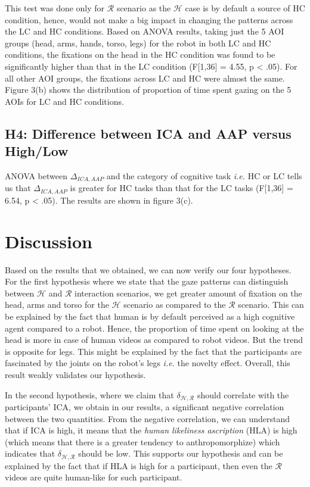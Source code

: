 \documentclass{acm_proc_article-sp}
\begin{document}
This test was done only for $\mathcal{R}$ scenario as the $\mathcal{H}$ case is
by default a source of HC condition, hence, would not make a big impact in
changing the patterns across the LC and HC conditions. Based on ANOVA results,
taking just the 5 AOI groups (head, arms, hands, torso, legs) for the robot in
both LC and HC conditions, the fixations on the head in the HC condition was
found to be significantly higher than that in the LC condition (F[1,36] = 4.55,
p < .05). For all other AOI groups, the fixations across LC and HC were almost
the same. Figure 3(b) shows the distribution of proportion of time spent gazing
on the 5 AOIs for LC and HC conditions.

\subsection{H4: Difference between ICA and AAP versus High/Low}

ANOVA between $\Delta_{ICA,AAP}$ and the category of cognitive task
\textit{i.e.} HC or LC tells us that $\Delta_{ICA,AAP}$ is greater for HC tasks
than that for the LC tasks (F[1,36] = 6.54, p < .05). The results are shown in
figure 3(c).


\section{Discussion}

Based on the results that we obtained, we can now verify our four hypotheses.
For the first hypothesis where we state that the gaze patterns can distinguish
between $\mathcal{H}$ and $\mathcal{R}$ interaction scenarios, we get greater
amount of fixation on the head, arms and torso for the $\mathcal{H}$ scenario as
compared to the $\mathcal{R}$ scenario. This can be explained by the fact that
human is by default perceived as a high cognitive agent compared to a robot.
Hence, the proportion of time spent on looking at the head is more in case of
human videos as compared to robot videos. But the trend is opposite for legs.
This might be explained by the fact that the participants are fascinated by the
joints on the robot's legs \textit{i.e.} the novelty effect. Overall, this
result weakly validates our hypothesis.

In the second hypothesis, where we claim that $\delta_{\mathcal{H},\mathcal{R}}$
should correlate with the participants' ICA, we obtain in our results, a
significant negative correlation between the two quantities. From the negative
correlation, we can understand that if ICA is high, it means that the
\textit{human likeliness ascription} (HLA) is high (which means that there is a
greater tendency to anthropomorphize) which indicates that
$\delta_{\mathcal{H},\mathcal{R}}$ should be low. This supports our hypothesis
and can be explained by the fact that if HLA is high for a participant, then
even the $\mathcal{R}$ videos are quite human-like for such participant. 
\end{document}
